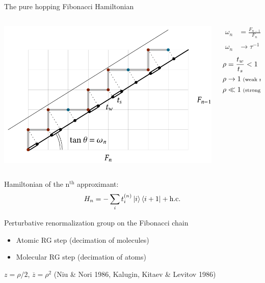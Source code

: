 \documentclass[xcolor=x11names,compress,professionalfonts]{beamer}
\renewcommand{\(}{\begin{columns}}
\renewcommand{\)}{\end{columns}}
\newcommand{\<}[1]{\begin{column}{#1}}
\renewcommand{\>}{\end{column}}
\newcommand{\zb}{\ensuremath{\overline{z}}}
\newcommand{\ham}{\ensuremath{H}}
\begin{document}
\begin{frame}{The pure hopping Fibonacci Hamiltonian}
\begin{columns}
\begin{column}{8.5cm}
	\centering
	\includegraphics[scale=.7]{cut_and_project.pdf}
\end{column}

\begin{column}{3cm}
\begin{align*}
\omega_n &= \frac{F_{n-1}}{F_{n}} \\
\omega_n &\rightarrow \tau^{-1} = \frac{\sqrt{5}-1}{2}
\end{align*}
\begin{align*}
\rho &= \frac{t_w}{t_s} < 1 \\
\rho &\rightarrow 1 \scriptsize{\text{ (weak modulation)}} \\
\rho &\ll 1 \scriptsize{\text{ (strong modulation)}}
\end{align*}
\end{column}
\end{columns}

	Hamiltonian of the n$^\text{th}$ approximant:
	\[ \ham_n = - \sum_i t_i^{(n)} \ket{i} \bra{i+1} + \text{h.c.} \]
\end{frame}

\begin{frame}{Perturbative renormalization group on the Fibonacci chain}
	\centering
	\begin{itemize}
	\item Atomic RG step (decimation of molecules) 
	\item Molecular RG step (decimation of atoms) 
	\end{itemize}
	\begin{flushright}
	$z= \rho/2$, $\zb = \rho^2$ (Niu \& Nori 1986, Kalugin, Kitaev \& Levitov 1986)
	\end{flushright}
\end{frame}
\end{document}
